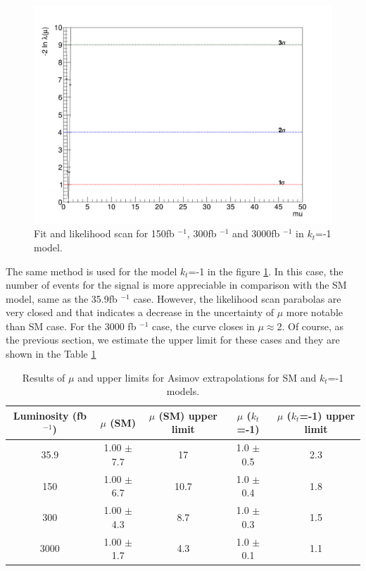 \begin{linenumbers}
\begin{figure}[!htbp]
\begin{minipage}[b]{0.48\textwidth}
			\includegraphics[width=\textwidth]{Chapter4/kt-1/3000fb/Likelihood.png}
		\end{minipage}
		\caption{Fit and likelihood scan for 150fb $^{-1}$, 300fb $^{-1}$ and 3000fb $^{-1}$ in $k_t$=-1 model.}
		\label{hm1}
	\end{figure}
	The same method is used for the model $k_t$=-1 in the figure \ref{hm1}. In this case, the number of events for the signal is more appreciable in comparison with the SM model, same as the 35.9fb $^{-1}$ case. However, the likelihood scan parabolas are very closed and that indicates a decrease in the uncertainty of $\mu$ more notable than SM case. For the 3000 fb $^{-1}$ case, the curve closes in $\mu \approx $2. 
	Of course, as the previous section, we estimate the upper limit for these cases and they are shown in the Table \ref{upper}
	
	\begin{table}[ht!]
		\caption{Results of $\mu$ and upper limits for Asimov extrapolations for SM and $k_t$=-1 models.}
		\begin{tabular}{|c|c|c|c|c|}
			\hline
			Luminosity (fb $^{-1}$)	&$\mu$ (SM) &$\mu$ (SM) upper limit    &   $\mu$ ($k_t$=-1) &$\mu$ ($k_t$=-1) upper limit   \\
			\hline
			35.9 & 1.00 $\pm$  7.7 &  17  & 1.0 $\pm$  0.5 & 2.3  \\
			\hline
			150& 1.00 $\pm$  6.7& 10.7  &  1.0 $\pm$  0.4 &1.8\\
			\hline
			300&1.00 $\pm$  4.3 &8.7 &  1.0 $\pm$  0.3 &1.5 \\
			\hline
			3000&1.00 $\pm$  1.7 & 4.3  &	 1.0 $\pm$  0.1 & 1.1\\
			\hline
		\end{tabular}
		\label{upper}
	\end{table}
	

\end{linenumbers}
